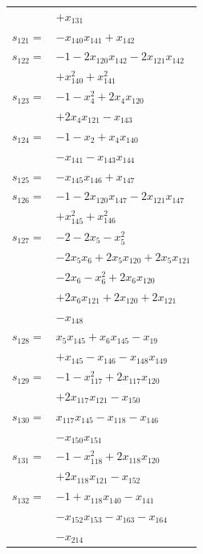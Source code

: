 \begin{longtable}{@{}r@{\;}l@{}}
 & \(\displaystyle +x_{131}\) \\[3pt]
\(s_{121}=\) & \(\displaystyle -x_{140}x_{141} +x_{142}\) \\[3pt]
\(s_{122}=\) & \(\displaystyle -1 -2x_{120}x_{142} -2x_{121}x_{142}\) \\
 & \(\displaystyle +x_{140}^{2} +x_{141}^{2}\) \\[3pt]
\(s_{123}=\) & \(\displaystyle -1 -x_{4}^{2} +2x_{4}x_{120}\) \\
 & \(\displaystyle +2x_{4}x_{121} -x_{143}\) \\[3pt]
\(s_{124}=\) & \(\displaystyle -1 -x_{2} +x_{4}x_{140}\) \\
 & \(\displaystyle -x_{141} -x_{143}x_{144}\) \\[3pt]
\(s_{125}=\) & \(\displaystyle -x_{145}x_{146} +x_{147}\) \\[3pt]
\(s_{126}=\) & \(\displaystyle -1 -2x_{120}x_{147} -2x_{121}x_{147}\) \\
 & \(\displaystyle +x_{145}^{2} +x_{146}^{2}\) \\[3pt]
\(s_{127}=\) & \(\displaystyle -2 -2x_{5} -x_{5}^{2}\) \\
 & \(\displaystyle -2x_{5}x_{6} +2x_{5}x_{120} +2x_{5}x_{121}\) \\
 & \(\displaystyle -2x_{6} -x_{6}^{2} +2x_{6}x_{120}\) \\
 & \(\displaystyle +2x_{6}x_{121} +2x_{120} +2x_{121}\) \\
 & \(\displaystyle -x_{148}\) \\[3pt]
\(s_{128}=\) & \(\displaystyle x_{5}x_{145} +x_{6}x_{145} -x_{19}\) \\
 & \(\displaystyle +x_{145} -x_{146} -x_{148}x_{149}\) \\[3pt]
\(s_{129}=\) & \(\displaystyle -1 -x_{117}^{2} +2x_{117}x_{120}\) \\
 & \(\displaystyle +2x_{117}x_{121} -x_{150}\) \\[3pt]
\(s_{130}=\) & \(\displaystyle x_{117}x_{145} -x_{118} -x_{146}\) \\
 & \(\displaystyle -x_{150}x_{151}\) \\[3pt]
\(s_{131}=\) & \(\displaystyle -1 -x_{118}^{2} +2x_{118}x_{120}\) \\
 & \(\displaystyle +2x_{118}x_{121} -x_{152}\) \\[3pt]
\(s_{132}=\) & \(\displaystyle -1 +x_{118}x_{140} -x_{141}\) \\
 & \(\displaystyle -x_{152}x_{153} -x_{163} -x_{164}\) \\
 & \(\displaystyle -x_{214}\) \\[3pt]

\end{longtable}
